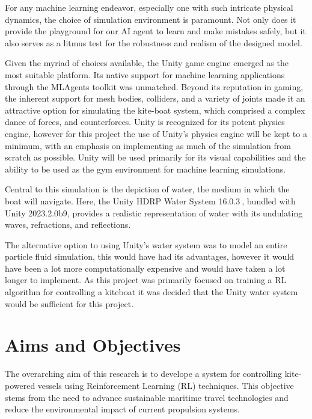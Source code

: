 For any machine learning endeavor, especially one with such intricate physical dynamics, the choice of simulation environment is paramount. Not only does it provide the playground for our AI agent to learn and make mistakes safely, but it also serves as a litmus test for the robustness and realism of the designed model.

Given the myriad of choices available, the Unity game engine emerged as the most suitable platform. Its native support for machine learning applications through the MLAgents toolkit was unmatched. Beyond its reputation in gaming, the inherent support for mesh bodies, colliders, and a variety of joints made it an attractive option for simulating the kite-boat system, which comprised a complex dance of forces, and counterforces. Unity is recognized for its potent physics engine, however for this project the use of Unity's physics engine will be kept to a minimum, with an emphasis on implementing as much of the simulation from scratch as possible. Unity will be used primarily for its visual capabilities and the ability to be used as the gym environment for machine learning simulations. 

Central to this simulation is the depiction of water, the medium in which the boat will navigate. Here, the Unity HDRP Water System 16.0.3$~$\cite{UnityHDRPWaterSystem}, bundled with Unity 2023.2.0b9, provides a realistic representation of water with its undulating waves, refractions, and reflections. 

The alternative option to using Unity's water system was to model an entire particle fluid simulation, this would have had its advantages, however it would have been a lot more computationally expensive and would have taken a lot longer to implement. As this project was primarily focused on training a RL algorithm for controlling a kiteboat it was decided that the Unity water system would be sufficient for this project.  






\section{Aims and Objectives}

The overarching aim of this research is to develope a system for controlling kite-powered vessels using Reinforcement Learning (RL) techniques. This objective stems from the need to advance sustainable maritime travel technologies and reduce the environmental impact of current propulsion systems. 

